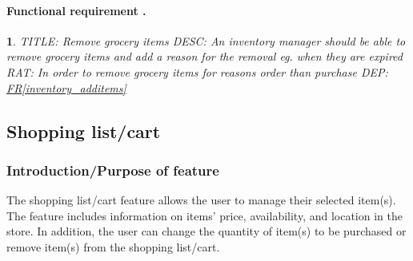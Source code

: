 \documentclass{scrreprt}
\newcounter{funcreq}
\theoremstyle{funreq}
\newtheorem{funreq}{}
\newcommand*{\reqref}[1]{\hyperref[#1]{FR\ref*{#1}}}
\begin{document}
	\paragraph[]{Functional requirement .}
	\begin{funreq}
		
		\label{inventory_remove}
		TITLE: Remove grocery items
		DESC: An inventory manager should be able to remove grocery items and add a reason for the removal eg. when they are expired
		RAT: In order to remove grocery items for reasons order than purchase
		DEP: \reqref{inventory_additems}
	\end{funreq}
	
	
	
	\subsection{Shopping list/cart}
	\subsubsection{Introduction/Purpose of feature}
	The shopping list/cart feature allows the user to manage their selected item(s). The feature includes information on items’ price, availability, and location in the store. In addition, the user can change the quantity of item(s) to be purchased or remove item(s) from the shopping list/cart.
	
\end{document}

